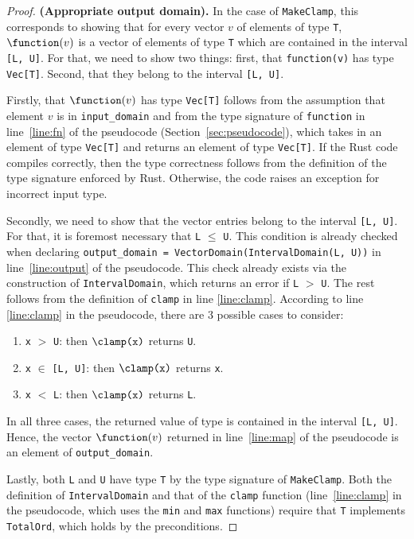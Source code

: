 \begin{proof}
\textbf{(Appropriate output domain).} In the case of \texttt{MakeClamp}, this corresponds to showing that for every vector $v$ of elements of type \texttt{T}, $\function(v)$ is a vector of elements of type \texttt{T} which are contained in the interval \texttt{[L, U]}. For that, we need to show two things: first, that \texttt{function(v)} has type \texttt{Vec[T]}.
Second, that they belong to the interval \texttt{[L, U]}.

Firstly, that $\function(v)$ has type \texttt{Vec[T]} follows from the assumption that element $v$ is in \texttt{input\_domain} and from the type signature of \texttt{function} in line~\ref{line:fn} of the pseudocode (Section~\ref{sec:pseudocode}), which takes in an element of type \texttt{Vec[T]} and returns an element of type \texttt{Vec[T]}. If the Rust code compiles correctly, then the type correctness follows from the definition of the type signature enforced by Rust. Otherwise, the code raises an exception for incorrect input type. 

Secondly, we need to show that the vector entries belong to the interval \texttt{[L, U]}. For that, it is foremost necessary that \texttt{L} $\leq$ \texttt{U}. This condition is already checked when declaring \texttt{output\_domain = VectorDomain(IntervalDomain(L, U))} in line~\ref{line:output} of the pseudocode. This check already exists via the construction of \texttt{IntervalDomain}, which returns an error if \texttt{L} $>$ \texttt{U}. The rest follows from the definition of \texttt{clamp} in line \ref{line:clamp}. According to line \ref{line:clamp} in the pseudocode, there are 3 possible cases to consider:
\begin{enumerate}
    \item \texttt{x} $>$ \texttt{U}: then $\clamp\texttt{(x)}$ returns \texttt{U}.
    \item \texttt{x} $\in$ \texttt{[L, U]}: then $\clamp\texttt{(x)}$ returns \texttt{x}.
    \item \texttt{x} $<$ \texttt{L}: then $\clamp\texttt{(x)}$ returns \texttt{L}.
\end{enumerate}
In all three cases, the returned value of type \T is contained in the interval \texttt{[L, U]}. Hence, the vector $\function(v)$ returned in line~\ref{line:map} of the pseudocode is an element of \texttt{output\_domain}.

Lastly, both \texttt{L} and \texttt{U} have type \texttt{T} by the type signature of \texttt{MakeClamp}. Both the definition of \texttt{IntervalDomain} and that of the \texttt{clamp} function (line~\ref{line:clamp} in the pseudocode, which uses the \texttt{min} and \texttt{max} functions) require that \texttt{T} implements \texttt{TotalOrd}, which holds by the preconditions.


\end{proof}
